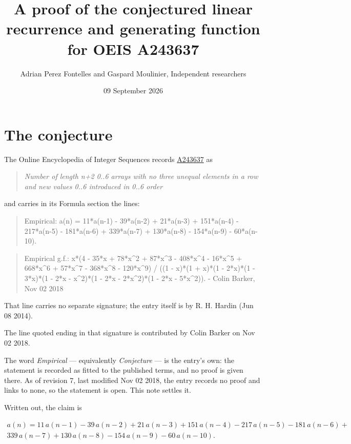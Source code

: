 \documentclass[11pt]{article}
\title{A proof of the conjectured linear recurrence and generating function for OEIS A243637}
\author{Adrian Perez Fontelles and Gaspard Moulinier, Independent researchers}
\date{09 September 2026}
\theoremstyle{definition}
\begin{document}
\maketitle
\section{The conjecture}

The Online Encyclopedia of Integer Sequences records \href{https://oeis.org/A243637}{A243637} as

\begin{quote}\itshape Number of length n+2 0..6 arrays with no three unequal elements in a row and new values 0..6 introduced in 0..6 order\end{quote}

and carries in its Formula section the lines:

\begin{quote}\ttfamily Empirical: a(n) = 11*a(n-1) - 39*a(n-2) + 21*a(n-3) + 151*a(n-4) - 217*a(n-5) - 181*a(n-6) + 339*a(n-7) + 130*a(n-8) - 154*a(n-9) - 60*a(n-10).\end{quote}

\begin{quote}\ttfamily Empirical g.f.: x*(4 - 35*x + 78*x\textasciicircum{}2 + 87*x\textasciicircum{}3 - 408*x\textasciicircum{}4 - 16*x\textasciicircum{}5 + 668*x\textasciicircum{}6 + 57*x\textasciicircum{}7 - 368*x\textasciicircum{}8 - 120*x\textasciicircum{}9) / ((1 - x)*(1 + x)*(1 - 2*x)*(1 - 3*x)*(1 - 2*x - x\textasciicircum{}2)*(1 - 2*x - 2*x\textasciicircum{}2)*(1 - 2*x - 5*x\textasciicircum{}2)). - Colin Barker, Nov 02 2018\end{quote}

That line carries no separate signature; the entry itself is by R. H. Hardin (Jun 08 2014).

The line quoted ending in that signature is contributed by Colin Barker on Nov 02 2018.

The word {\itshape Empirical} --- equivalently {\itshape Conjecture} --- is the entry's own: the statement is recorded as fitted to the published terms, and no proof is given there. As of revision 7, last modified Nov 02 2018, the entry records no proof and links to none, so the statement is open. This note settles it.

Written out, the claim is

\begin{multline*} a(n) = 11\,a(n-1) - 39\,a(n-2) + 21\,a(n-3) + 151\,a(n-4) - 217\,a(n-5) - 181\,a(n-6) + \\ 339\,a(n-7) + 130\,a(n-8) - 154\,a(n-9) - 60\,a(n-10). \end{multline*}
\end{document}
